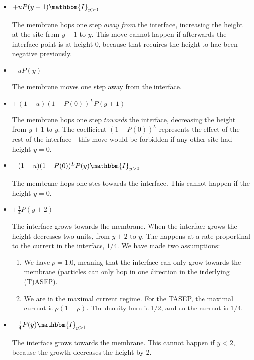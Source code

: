 \documentclass[a4paper,10pt]{article}
\newcommand{\I}{\mathbbm{I}}
\begin{document}
\begin{itemize}
 \item  $+ uP(y-1) \I_{y>0}$ \newline
 
        The membrane hops one step \emph{away from} the interface, increasing the height at the site from $y-1$ to $y$. This move cannot happen if afterwards the interface point is at height 0, because that requires the height to hae been negative previously.
        
 \item  $-uP(y)$ \newline
 
	The membrane moves one step away from the interface.
	
 \item $ + (1-u)(1-P(0))^L P(y+1)$ \newline
 
        The membrane hops one step \emph{towards} the interface, decreasing the height from $y+1$ to $y$. The coefficient $(1-P(0))^L$ represents the effect of the rest of the interface - this move would be forbidden if any other site had height $y=0$.
        
 \item $ - (1-u)(1-P(0))^L P(y)\I_{y>0}$ \newline
 
        The membrane hops one stes towards the interface. This cannot happen if the height $y=0$.
        
 \item $ + \frac{1}{4}P(y+2)$ \newline
 
        The interface grows towards the membrane. When the interface grows the height decreases two units, from $y+2$ to $y$. The happens at a rate proportinal to the current in the interface, $1/4$. We have made two assumptions:
        \begin{enumerate}
         \item We have $p=1.0$, meaning that the interface can only grow towards the membrane (particles can only hop in one direction in the inderlying (T)ASEP).
         \item We are in the maximal current regime. For the TASEP, the maximal current is $\rho(1-\rho)$. The density here is $1/2$, and so the current is $1/4$.
        \end{enumerate}

 \item $-  \frac{1}{4}P(y) \I_{y>1}$ \newline
 
        The interface grows towards the membrane. This cannot happen if $y< 2$, because the growth decreases the height by 2.
\end{itemize}
\end{document}
